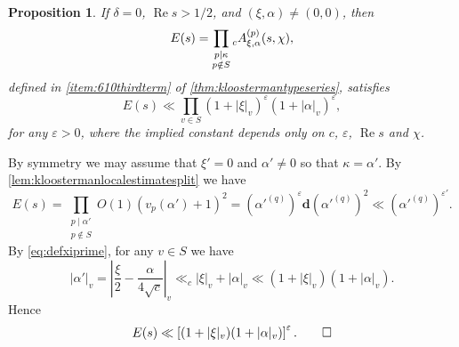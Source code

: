 \documentclass[10pt,oneside,reqno]{amsart}
\makeatletter
\renewcommand\Re{\mathop{\mathrm{Re}}}
\theoremstyle{THEOREM}
\newtheorem{proposition}[theorem]{Proposition}
\theoremstyle{DEFINITION}
\theoremstyle{EXERCISE}
\numberwithin{equation}{section}
\renewenvironment{proof}[1][\proofname]{\par
  \vspace{-6pt}
  \pushQED{\qed}
  \normalfont \topsep6\p@\@plus6\p@\relax
  \trivlist
  \item[\hskip\labelsep\rmfamily\bfseries
    #1\@addpunct{:}]\ignorespaces
}{
  \popQED\endtrivlist\@endpefalse
  \vspace{-6pt}
}
\makeatother
\begin{document}
\begin{proposition}\label{prop:kloostermansumbound2}
If $\delta=0$, $\Re s>1/2$, and $(\xi,\alpha)\neq (0,0)$, then
\[
E(s)=\prod_{\substack{p\mid \kappa\\ p\notin S}}\prescript{}{c}{A}_{\xi,\alpha}^{(p)}(s,\chi),
\]
defined in \autoref{item:610thirdterm} of \autoref{thm:kloostermantypeseries}, satisfies
\[
E(s)\ll \prod_{v\in S}(1+|\xi|_v)^{\varepsilon}(1+|\alpha|_v)^{\varepsilon},
\]
for any $\varepsilon>0$,
where the implied constant depends only on $c$, $\varepsilon$, $\Re s$ and $\chi$.
\end{proposition}
\begin{proof}
By symmetry we may assume that $\xi'= 0$ and $\alpha'\neq 0$ so that $\kappa=\alpha'$. By \autoref{lem:kloostermanlocalestimatesplit} we have
\[
E(s)=\prod_{\substack{p\mid \alpha'\\ p\notin S}}O(1)(v_p(\alpha')+1)^2=(\alpha'^{(q)})^\varepsilon\bm d(\alpha'^{(q)})^2\ll (\alpha'^{(q)})^{\varepsilon'}.
\]
By \eqref{eq:defxiprime}, for any $v\in S$ we have
\[
|\alpha'|_v=\left|\frac{\xi}{2}-\frac{\alpha}{4\sqrt{c}}\right|_v\ll_c |\xi|_v+|\alpha|_v\ll (1+|\xi|_v)(1+|\alpha|_v).
\]
Hence
\[
E(s)\ll \left[(1+|\xi|_v)(1+|\alpha|_v)\right]^\varepsilon.\qedhere
\]
\end{proof}
\end{document}
